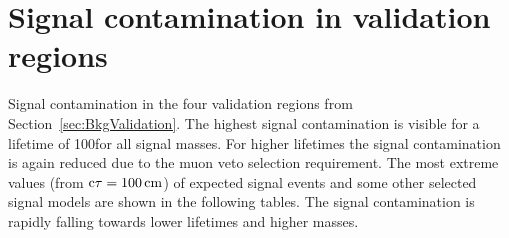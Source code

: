 \section{Signal contamination in validation regions}
\label{app:SignalContamination}

Signal contamination in the four validation regions from Section~\ref{sec:BkgValidation}.
The highest signal contamination is visible for a lifetime of 100\cm for all signal masses.
For higher lifetimes the signal contamination is again reduced due to the muon veto selection requirement.
The most extreme values (from $\text{c}\tau=100\,\text{cm}$) of expected signal events and some other selected signal models are shown in the following tables.
The signal contamination is rapidly falling towards lower lifetimes and higher masses.

\renewcommand{\arraystretch}{1.5}
\begin{table}[!h]
\centering
\caption{Signal contamination in leptonic control region: $\ecalo>10\gev$ and \mbox{$\nhits>6$}. 
         $N_S$ is the number of expected signal events and $\Delta B$ is the statistical uncertainty on the background prediction.}
\end{table}

